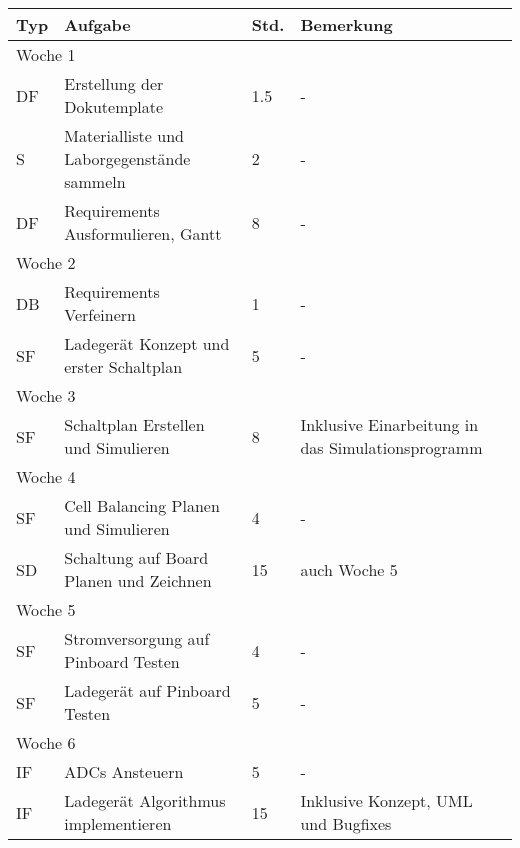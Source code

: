 \vspace{1em}
\begin{table}[!hp]
    \begin{center}
    \begin{tabular}{|p{0.8cm}|p{6cm}|p{0.8cm}|p{8cm}|} \hline
        \textbf{Typ} & \textbf{Aufgabe} & \textbf{Std.} & \textbf{Bemerkung} \\ \hline
        \multicolumn{4}{|l|}{Woche 1}                                                            \\ \hline
        DF           & Erstellung der Dokutemplate & 1.5           & -                  \\ 
        S            & Materialliste und Laborgegenstände sammeln & 2 & -\\
		DF           & Requirements Ausformulieren, Gantt         & 8 & -\\ \hline
        \multicolumn{4}{|l|}{Woche 2}                                                            \\ \hline
        DB& Requirements Verfeinern                    & 1 & -\\
        SF & Ladegerät Konzept und erster Schaltplan   & 5 & -\\ \hline
        \multicolumn{4}{|l|}{Woche 3}                                                            \\ \hline
        SF & Schaltplan Erstellen und Simulieren      & 8 & Inklusive Einarbeitung in das Simulationsprogramm \\ \hline
        \multicolumn{4}{|l|}{Woche 4}                                                            \\ \hline
        SF & Cell Balancing Planen und Simulieren     & 4 & -\\
        SD & Schaltung auf Board Planen und Zeichnen  & 15 & auch Woche 5\\ \hline
        \multicolumn{4}{|l|}{Woche 5}                                                            \\ \hline
        SF & Stromversorgung auf Pinboard Testen      & 4 & -\\
        SF & Ladegerät auf Pinboard Testen            & 5 & -\\ \hline
        \multicolumn{4}{|l|}{Woche 6}                                                            \\ \hline
        IF & ADCs Ansteuern                          & 5 & -\\
        IF & Ladegerät Algorithmus implementieren   & 15 & Inklusive Konzept, UML und Bugfixes \\ \hline

\end{tabular}
\end{center}
\end{table}
